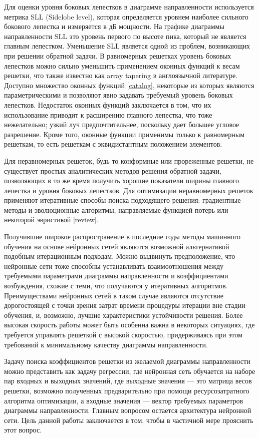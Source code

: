 \documentclass[nonacm, sigconf]{acmart}
\begin{document}
Для оценки уровня боковых лепестков в диаграмме направленности используется метрика SLL (Sidelobe level), которая определяется уровнем наиболее сильного бокового лепестка и измеряется в дБ мощности. На графике диаграммы направленности SLL это уровень первого по высоте пика, который не является главным лепестком. Уменьшение SLL является одной из проблем, возникающих при решении обратной задачи. В равномерных решетках уровень боковых лепестков можно сильно уменьшить применением оконных функций к весам решетки, что также известно как array tapering в англоязычной литературе. Доступно множество оконных функций \ref{catalog}, некоторые из которых являются параметрическими и позволяют явно задавать требуемый уровень боковых лепестков. Недостаток оконных функций заключается в том, что их использование приводит к расширению главного лепестка, что тоже нежелательно; узкий луч предпочтительнее, поскольку дает большее угловое разрешение. Кроме того, оконные функции применимы только к равномерным решеткам, то есть решеткам с эквидистантным положением элементов.

Для неравномерных решеток, будь то конформные или прореженные решетки, не существует простых аналитических методов решения обратной задачи, позволяющих в то же время получить хорошие показатели ширины главного лепестка и уровня боковых лепестков. Для оптимизации неравномерных решеток применяют итеративные способы поиска подходящего решения: градиентные методы и эволюционные алгоритмы, направляемые функцией потерь или некоторой эвристикой \ref{review}.

Получившие широкое распространение в последние годы методы машинного обучения на основе нейронных сетей являются возможной альтернативой подобным итерационным подходам. Можно выдвинуть предположение, что нейронные сети тоже способны устанавливать взаимоотношения между требуемыми параметрами диаграммы направленности и коэффициентами возбуждения, схожие с теми, что получаются у итеративных алгоритмов. Преимуществами нейронных сетей в таком случае являются отсутствие дорогостоящей с точки зрения затрат времени процедуры итерации вне стадии обучения, и, возможно, лучшие характеристики устойчивости решения. Более высокая скорость работы может быть особенна важна в некоторых ситуациях, где требуется управлять решеткой с высокой скоростью, придерживаясь при этом требований к минимальному качеству диаграммы направленности.

Задачу поиска коэффициентов решетки из желаемой диаграммы направленности можно представить как задачу регрессии, где нейронная сеть обучается на наборе пар входных и выходных значений, где выходные значения --- это матрица весов решетки, возможно полученных предварительно при помощи ресурсозатратного алгоритма оптимизации, а входные значения --- вектор требуемых параметров диаграммы направленности. Главным вопросом остается архитектура нейронной сети. Цель данной работы заключается в том, чтобы в частичной мере прояснить этот вопрос.
\end{document}
